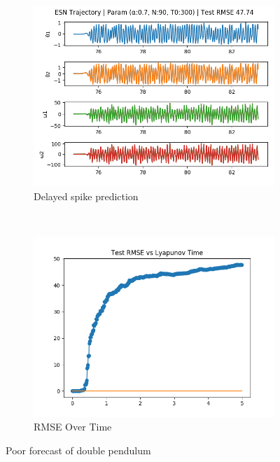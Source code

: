 \documentclass{article}
\begin{document}
\begin{figure}[H]
    \centering
    \begin{subfigure}[b]{0.45\textwidth}
        \includegraphics[width=\textwidth]{doc/paper/images/doub_pend/rank_3_param_52_fit.png}
        \caption{Delayed spike prediction}
    \end{subfigure}
    ~
    \begin{subfigure}[b]{0.45\textwidth}
        \includegraphics[width=\textwidth]{doc/paper/images/doub_pend/rank_3_param_52_rmse.png}
        \caption{RMSE Over Time}
    \end{subfigure}
    \caption{Poor forecast of double pendulum}
\end{figure}
\end{document}

